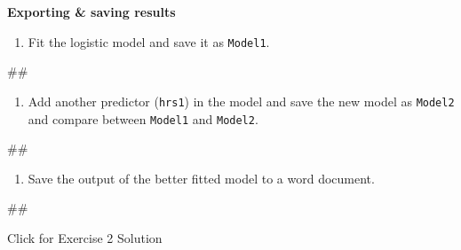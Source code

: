 \documentclass[
]{book}
\newenvironment{Shaded}{\begin{snugshade}}{\end{snugshade}}
\newcommand{\NormalTok}[1]{#1}
\providecommand{\tightlist}{%
  \setlength{\itemsep}{0pt}\setlength{\parskip}{0pt}}
\begin{document}
\textbf{Exporting \& saving results}

\begin{enumerate}
\def\labelenumi{\arabic{enumi}.}
\tightlist
\item
  Fit the logistic model and save it as \texttt{Model1}.
\end{enumerate}

\begin{Shaded}
\begin{Highlighting}[]
\NormalTok{\#\#}
\end{Highlighting}
\end{Shaded}

\begin{enumerate}
\def\labelenumi{\arabic{enumi}.}
\setcounter{enumi}{1}
\tightlist
\item
  Add another predictor (\texttt{hrs1}) in the model and save the new model as \texttt{Model2} and compare between \texttt{Model1} and \texttt{Model2}.
\end{enumerate}

\begin{Shaded}
\begin{Highlighting}[]
\NormalTok{\#\#}
\end{Highlighting}
\end{Shaded}

\begin{enumerate}
\def\labelenumi{\arabic{enumi}.}
\setcounter{enumi}{2}
\tightlist
\item
  Save the output of the better fitted model to a word document.
\end{enumerate}

\begin{Shaded}
\begin{Highlighting}[]
\NormalTok{\#\#}
\end{Highlighting}
\end{Shaded}

{Click for Exercise 2 Solution}
\end{document}
